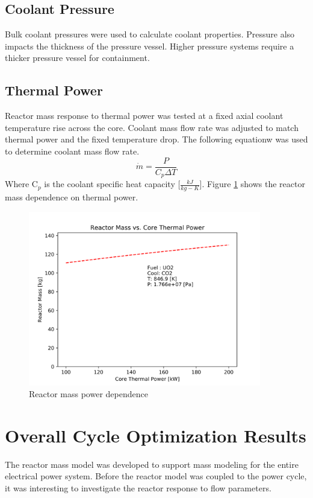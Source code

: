 \subsection{Coolant Pressure}
Bulk coolant pressures were used to calculate coolant properties. Pressure also
impacts the thickness of the pressure vessel. Higher pressure systems require a
thicker pressure vessel for containment.

\subsection{Thermal Power}
Reactor mass response to thermal power was tested at a fixed axial coolant temperature
rise across the core. Coolant mass flow rate was adjusted to match thermal power
and the fixed temperature drop. The following equationw was used to determine
coolant mass flow rate.
\begin{equation}
    \dot{m} = \frac{P}{C_p \Delta T}
\end{equation}
Where C$_p$ is the coolant specific heat capacity [$\frac{kJ}{kg-K}$].
Figure \ref{fig:mass_vs_q_uo2_co2} shows the reactor mass dependence on thermal
power.

\begin{figure}[h]
    \centering
    \includegraphics[width=4in]{../images/mass_vs_q_uo2_co2.png}
\caption{Reactor mass power dependence}
\label{fig:mass_vs_q_uo2_co2}
\end{figure}

\section{Overall Cycle Optimization Results}
The reactor mass model was developed to support mass modeling for the entire
electrical power system. Before the reactor model was coupled to the power
cycle, it was interesting to investigate the reactor response to flow
parameters. 

